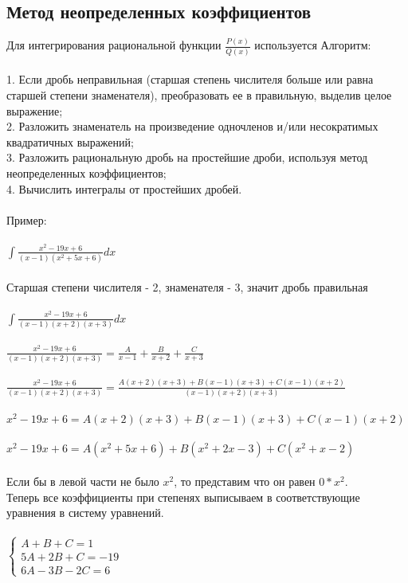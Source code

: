 \documentclass[12pt,a4paper]{article}
\begin{document}
\subsection{Метод неопределенных коэффициентов}
Для интегрирования рациональной функции $\frac{P(x)}{Q(x)}$ используется Алгоритм: \\\\
1. Если дробь неправильная (старшая степень числителя больше или равна старшей степени знаменателя), преобразовать ее в правильную, выделив целое выражение; \\
2. Разложить знаменатель на произведение одночленов и/или несократимых квадратичных выражений; \\
3. Разложить рациональную дробь на простейшие дроби, используя метод неопределенных коэффициентов; \\
4. Вычислить интегралы от простейших дробей. \\\\
Пример: \\\\
$ \int{\frac{x^2-19x+6}{(x-1)(x^2+5x+6)}dx} $ \\\\ 
Старшая степени числителя - 2, знаменателя - 3, значит дробь правильная \\\\
$ \int{\frac{x^2-19x+6}{(x-1)(x+2)(x+3)}dx} $ \\\\
$ \frac{x^2-19x+6}{(x-1)(x+2)(x+3)}=\frac{A}{x-1}+\frac{B}{x+2}+\frac{C}{x+3} $ \\\\
$ \frac{x^2-19x+6}{(x-1)(x+2)(x+3)}=\frac{A(x+2)(x+3)+B(x-1)(x+3)+C(x-1)(x+2)}{(x-1)(x+2)(x+3)} $ \\\\
$ x^2-19x+6=A(x+2)(x+3)+B(x-1)(x+3)+C(x-1)(x+2) $ \\\\
$ x^2-19x+6=A(x^2+5x+6)+B(x^2+2x-3)+C(x^2+x-2) $ \\\\
Если бы в левой части не было $x^2$, то представим что он равен $0*x^2$. \\
Теперь все коэффициенты при степенях выписываем в соответствующие уравнения в систему уравнений. \\\\
$\begin{cases}
A+B+C=1 \\
5A+2B+C=-19 \\
6A-3B-2C=6
\end{cases}$
\end{document}
